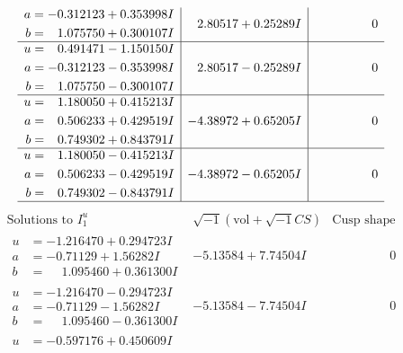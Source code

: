 \documentclass[1p]{elsarticle_modified}
\theoremstyle{definition}
\newcommand{\I}{\sqrt{-1}}
\begin{document}
$$\begin{array}{c|c|c}
\begin{aligned}
a &= -0.312123 + 0.353998 I \\
b &= \phantom{-}1.075750 + 0.300107 I\end{aligned}
 & \phantom{-}2.80517 + 0.25289 I & \phantom{-0.000000 } 0 \\ \hline\begin{aligned}
u &= \phantom{-}0.491471 - 1.150150 I \\
a &= -0.312123 - 0.353998 I \\
b &= \phantom{-}1.075750 - 0.300107 I\end{aligned}
 & \phantom{-}2.80517 - 0.25289 I & \phantom{-0.000000 } 0 \\ \hline\begin{aligned}
u &= \phantom{-}1.180050 + 0.415213 I \\
a &= \phantom{-}0.506233 + 0.429519 I \\
b &= \phantom{-}0.749302 + 0.843791 I\end{aligned}
 & -4.38972 + 0.65205 I & \phantom{-0.000000 } 0 \\ \hline\begin{aligned}
u &= \phantom{-}1.180050 - 0.415213 I \\
a &= \phantom{-}0.506233 - 0.429519 I \\
b &= \phantom{-}0.749302 - 0.843791 I\end{aligned}
 & -4.38972 - 0.65205 I & \phantom{-0.000000 } 0\\
 \hline 
 \end{array}$$\newpage$$\begin{array}{c|c|c}  
\text{Solutions to }I^u_{1}& \I (\text{vol} + \sqrt{-1}CS) & \text{Cusp shape}\\
 \hline 
\begin{aligned}
u &= -1.216470 + 0.294723 I \\
a &= -0.71129 + 1.56282 I \\
b &= \phantom{-}1.095460 + 0.361300 I\end{aligned}
 & -5.13584 + 7.74504 I & \phantom{-0.000000 } 0 \\ \hline\begin{aligned}
u &= -1.216470 - 0.294723 I \\
a &= -0.71129 - 1.56282 I \\
b &= \phantom{-}1.095460 - 0.361300 I\end{aligned}
 & -5.13584 - 7.74504 I & \phantom{-0.000000 } 0 \\ \hline\begin{aligned}
u &= -0.597176 + 0.450609 I \\

\end{aligned}
\end{array}$$
\end{document}
